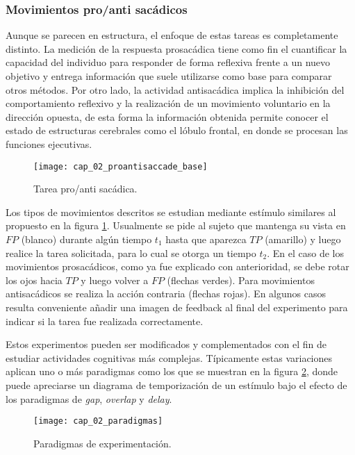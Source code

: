 \documentclass[../main.tex]{subfiles}
\begin{document}
			\vspace{-5mm}
			\subsubsection{Movimientos pro/anti sacádicos}
			\label{ssub:movimientos_pro_anti_sacadicos}
				Aunque se parecen en estructura, el enfoque de estas tareas es completamente distinto. La medición de la respuesta prosacádica tiene como fin el cuantificar la capacidad del individuo para responder de forma reflexiva frente a un nuevo objetivo y entrega información que suele utilizarse como base para comparar otros métodos. Por otro lado, la actividad antisacádica implica la inhibición del comportamiento reflexivo y la realización de un movimiento voluntario en la dirección opuesta, de esta forma la información obtenida permite conocer el estado de estructuras cerebrales como el lóbulo frontal, en donde se procesan las funciones ejecutivas.	
				\begin{figure}[H]
					\centering
					\texttt{[image: cap\_02\_proantisaccade\_base]}
					\caption{Tarea pro/anti sacádica.}
					\label{fig:02_pro_anti_saccade_base}
				\end{figure}  

				Los tipos de movimientos descritos se estudian mediante estímulo similares al propuesto en la figura \ref{fig:02_pro_anti_saccade_base}. Usualmente se pide al sujeto que mantenga su vista en $FP$ (blanco) durante algún tiempo $t_1$ hasta que aparezca $TP$ (amarillo) y luego realice la tarea solicitada, para lo cual se otorga un tiempo $t_2$. En el caso de los movimientos prosacádicos, como ya fue explicado con anterioridad, se debe rotar los ojos hacia $TP$ y luego volver a $FP$ (flechas verdes). Para movimientos antisacádicos se realiza la acción contraria (flechas rojas). En algunos casos resulta conveniente añadir una imagen de feedback al final del experimento para indicar si la tarea fue realizada correctamente. 

				Estos experimentos pueden ser modificados y complementados con el fin de estudiar actividades cognitivas más complejas. Típicamente estas variaciones aplican uno o más paradigmas como los que se muestran en la figura \ref{fig:02_paradigmas}, donde puede apreciarse un diagrama de temporización de un estímulo bajo el efecto de los paradigmas de \textit{gap}, \textit{overlap} y \textit{delay}. 
				\begin{figure}[H]
					\centering
					\texttt{[image: cap\_02\_paradigmas]}
					\caption{Paradigmas de experimentación.}
					\label{fig:02_paradigmas}
				\end{figure} 
\end{document}
